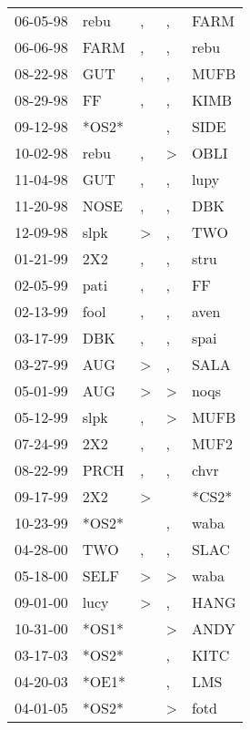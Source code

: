 \begin{supertabular}{lllll}
 06-05-98 &   rebu &             , &             , &   FARM \\
 06-06-98 &   FARM &             , &             , &   rebu \\
 08-22-98 &    GUT &             , &             , &   MUFB \\
 08-29-98 &     FF &             , &             , &   KIMB \\
 09-12-98 &  *OS2* &               &             , &   SIDE \\
 10-02-98 &   rebu &             , &  \textgreater &   OBLI \\
 11-04-98 &    GUT &             , &             , &   lupy \\
 11-20-98 &   NOSE &             , &             , &    DBK \\
 12-09-98 &   slpk &  \textgreater &             , &    TWO \\
 01-21-99 &    2X2 &             , &             , &   stru \\
 02-05-99 &   pati &             , &             , &     FF \\
 02-13-99 &   fool &             , &             , &   aven \\
 03-17-99 &    DBK &             , &             , &   spai \\
 03-27-99 &    AUG &  \textgreater &             , &   SALA \\
 05-01-99 &    AUG &  \textgreater &  \textgreater &   noqs \\
 05-12-99 &   slpk &             , &  \textgreater &   MUFB \\
 07-24-99 &    2X2 &             , &             , &   MUF2 \\
 08-22-99 &   PRCH &             , &             , &   chvr \\
 09-17-99 &    2X2 &  \textgreater &               &  *CS2* \\
 10-23-99 &  *OS2* &               &             , &   waba \\
 04-28-00 &    TWO &             , &             , &   SLAC \\
 05-18-00 &   SELF &  \textgreater &  \textgreater &   waba \\
 09-01-00 &   lucy &  \textgreater &             , &   HANG \\
 10-31-00 &  *OS1* &               &  \textgreater &   ANDY \\
 03-17-03 &  *OS2* &               &             , &   KITC \\
 04-20-03 &  *OE1* &               &             , &    LMS \\
 04-01-05 &  *OS2* &               &  \textgreater &   fotd \\
\end{supertabular}
